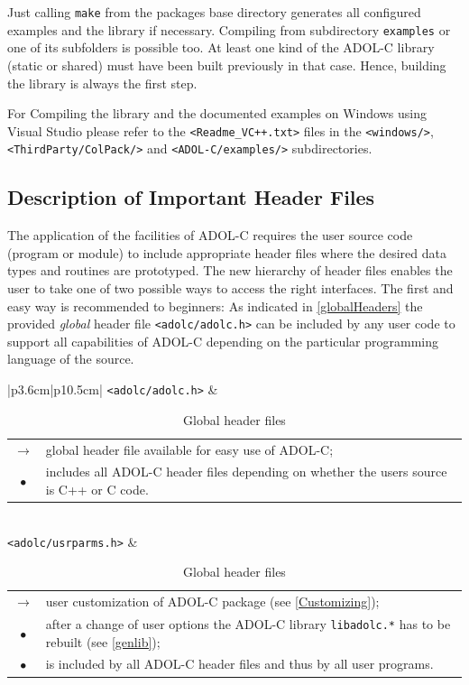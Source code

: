 \documentclass[11pt,twoside]{article}
\begin{document}
Just calling \verb=make= from the packages base directory generates
all configured examples and the library if necessary. Compiling from
subdirectory \verb=examples= or one of its subfolders is possible
too. At least one kind of the ADOL-C library (static or shared) must
have been built previously in that case. Hence, building the library
is always the first step. 

For Compiling the library and the documented examples on Windows using
Visual Studio please refer to the \verb=<Readme_VC++.txt>= files in 
the \verb=<windows/>=, \verb=<ThirdParty/ColPack/>= and 
\verb=<ADOL-C/examples/>= subdirectories.
%
\subsection{Description of Important Header Files}
\label{ssec:DesIH}
%
The application of the facilities of ADOL-C requires the user 
source code (program or module) to include appropriate 
header files where the desired data types and routines are 
prototyped. The new hierarchy of header files enables the user
to take one of two possible ways to access the right interfaces.
The first and easy way is recommended to beginners: As indicated in
\autoref{globalHeaders} the provided {\em global} header file 
\verb=<adolc/adolc.h>= can be included by any user code to support all
capabilities of ADOL-C depending on the particular programming language
of the source.    

\begin{table}[h]
\center \small
\begin{tabular}{|p{3.6cm}|p{10.5cm}|}\hline
\verb=<adolc/adolc.h>= & 
\begin{tabular*}{10.5cm}{cp{9.5cm}}
  \boldmath $\rightarrow$ \unboldmath
                 & global header file available for easy use of ADOL-C; \\
  $\bullet$      & includes all ADOL-C header files depending on
                   whether the users source is C++ or C code.
\end{tabular*}
\\ \hline
\verb=<adolc/usrparms.h>= &
\begin{tabular*}{10.5cm}{cp{9.5cm}}
  \boldmath $\rightarrow$ \unboldmath
                 & user customization of ADOL-C package (see
                   \autoref{Customizing}); \\
  $\bullet$      & after a change of
                   user options the ADOL-C library \verb=libadolc.*=
                   has to be rebuilt (see \autoref{genlib}); \\
  $\bullet$      & is included by all ADOL-C header files and thus by all user
                   programs.
\end{tabular*} \\ \hline
\end{tabular}
\caption{Global header files}
\label{globalHeaders}
\end{table}  
\end{document}

